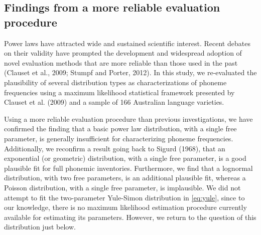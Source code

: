 \hypertarget{findings-from-a-more-reliable-evaluation-procedure}{%
\subsection*{Findings from a more reliable evaluation procedure}\label{findings-from-a-more-reliable-evaluation-procedure}}

Power laws have attracted wide and sustained scientific interest. Recent debates on their validity have prompted the development and widespread adoption of novel evaluation methods that are more reliable than those used in the past (Clauset et al., 2009; Stumpf and Porter, 2012). In this study, we re-evaluated the plausibility of several distribution types as characterizations of phoneme frequencies using a maximum likelihood statistical framework presented by Clauset et al. (2009) and a sample of 166 Australian language varieties.

Using a more reliable evaluation procedure than previous investigations, we have confirmed the finding that a basic power law distribution, with a single free parameter, is generally insufficient for characterizing phoneme frequencies. Additionally, we reconfirm a result going back to Sigurd (1968), that an exponential (or geometric) distribution, with a single free parameter, is a good plausible fit for full phonemic inventories. Furthermore, we find that a lognormal distribution, with two free parameters, is an additional plausible fit, whereas a Poisson distribution, with a single free parameter, is implausible. We did not attempt to fit the two-parameter Yule-Simon distribution in \eqref{eq:yule}, since to our knowledge, there is no maximum likelihood estimation procedure currently available for estimating its parameters. However, we return to the question of this distribution just below.

